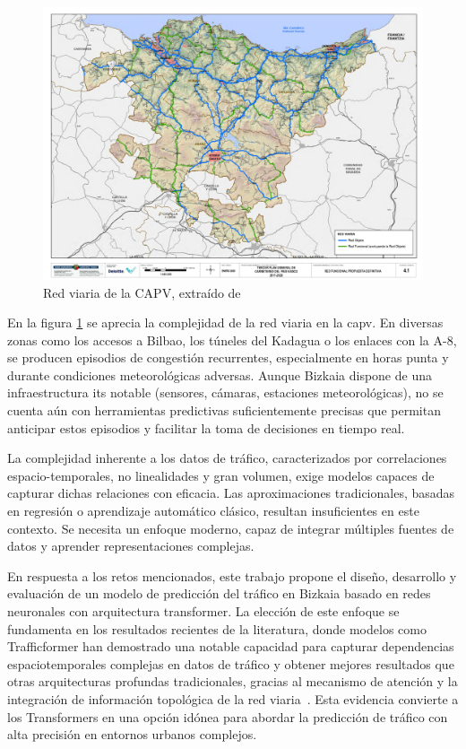 \begin{figure}[h]
	\centering
	\includegraphics[scale=0.5]{includes/red_viaria_capv.png}
	\caption[Red viaria de la CAPV]{Red viaria de la CAPV, extraído de \cite{pgcpv}}
	\label{fig:red_viaria}
\end{figure}


En la figura \ref{fig:red_viaria} se aprecia la complejidad de la red viaria en la \acrshort{capv}. En diversas zonas como los accesos a Bilbao, los túneles del Kadagua o los enlaces con la A-8, se producen episodios de congestión recurrentes, especialmente en horas punta y durante condiciones meteorológicas adversas. Aunque Bizkaia dispone de una infraestructura \acrshort{its} notable (sensores, cámaras, estaciones meteorológicas), no se cuenta aún con herramientas predictivas suficientemente precisas que permitan anticipar estos episodios y facilitar la toma de decisiones en tiempo real.

La complejidad inherente a los datos de tráfico, caracterizados por correlaciones espacio-temporales, no linealidades y gran volumen, exige modelos capaces de capturar dichas relaciones con eficacia. Las aproximaciones tradicionales, basadas en regresión o aprendizaje automático clásico, resultan insuficientes en este contexto. Se necesita un enfoque moderno, capaz de integrar múltiples fuentes de datos y aprender representaciones complejas.

En respuesta a los retos mencionados, este trabajo propone el diseño, desarrollo y evaluación de un modelo de predicción del tráfico en Bizkaia basado en redes neuronales con arquitectura transformer. La elección de este enfoque se fundamenta en los resultados recientes de la literatura, donde modelos como Trafficformer han demostrado una notable capacidad para capturar dependencias espaciotemporales complejas en datos de tráfico y obtener mejores resultados que otras arquitecturas profundas tradicionales, gracias al mecanismo de atención y la integración de información topológica de la red viaria \cite{trafficformer}. Esta evidencia convierte a los Transformers en una opción idónea para abordar la predicción de tráfico con alta precisión en entornos urbanos complejos.

